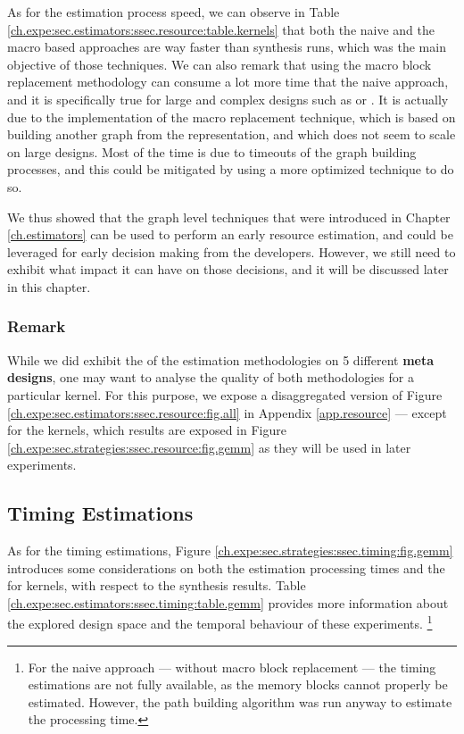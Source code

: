         As for the estimation process speed, we can observe in Table \ref{ch.expe:sec.estimators:ssec.resource:table.kernels} that both the naive and the macro based approaches are way faster than synthesis runs, which was the main objective of those techniques.
        We can also remark that using the macro block replacement methodology can consume a lot more time that the naive approach, and it is specifically true for large and complex designs such as  or .
        It is actually due to the implementation of the macro replacement technique, which is based on building another graph from the  representation, and which does not seem to scale on large designs.
        Most of the time is due to timeouts of the graph building processes, and this could be mitigated by using a more optimized technique to do so.

        We thus showed that the graph level techniques that were introduced in Chapter \ref{ch.estimators} can be used to perform an early resource estimation, and could be leveraged for early decision making from the developers.        
        However, we still need to exhibit what impact it can have on those decisions, and it will be discussed later in this chapter.

        \subsubsection*{Remark}
        While we did exhibit the  of the estimation methodologies on 5 different {\bf meta designs}, one may want to analyse the quality of both methodologies for a particular kernel. 
        For this purpose, we expose a disaggregated version of Figure \ref{ch.expe:sec.estimators:ssec.resource:fig.all} in Appendix \ref{app.resource} --- except for the  kernels, which results are exposed in Figure \ref{ch.expe:sec.strategies:ssec.resource:fig.gemm} as they will be used in later experiments.

    \subsection{Timing Estimations}
    \label{ch.expe:sec.estimators:ssec.timing}

       As for the timing estimations, Figure \ref{ch.expe:sec.strategies:ssec.timing:fig.gemm} introduces some considerations on both the estimation processing times and the  for  kernels, with respect to the synthesis results.
       Table \ref{ch.expe:sec.estimators:ssec.timing:table.gemm} provides more information about the explored design space and the temporal behaviour of these experiments.%
       \footnote{For the naive approach --- \ie without macro block replacement --- the timing estimations are not fully available, as the memory blocks cannot properly be estimated.
       However, the path building algorithm was run anyway to estimate the processing time.}

